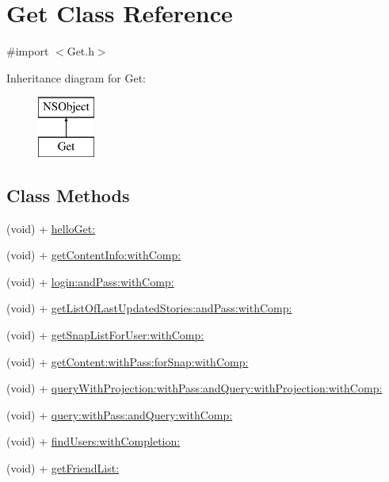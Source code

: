 \hypertarget{interface_get}{}\section{Get Class Reference}
\label{interface_get}


{\ttfamily \#import $<$Get.\+h$>$}

Inheritance diagram for Get\+:\begin{figure}[H]
\begin{center}
\leavevmode
\includegraphics[height=2.000000cm]{interface_get}
\end{center}
\end{figure}
\subsection*{Class Methods}
\begin{DoxyCompactItemize}
\item 
(void) + \hyperlink{interface_get_af1d0a2c1422b398f8f1e5032a78224c8}{hello\+Get\+:}
\item 
(void) + \hyperlink{interface_get_ad2ab0ea6e3e0b8253cfe9998196d1cc5}{get\+Content\+Info\+:with\+Comp\+:}
\item 
(void) + \hyperlink{interface_get_a76426840dad90ee35b87ad57ea87a3ca}{login\+:and\+Pass\+:with\+Comp\+:}
\item 
(void) + \hyperlink{interface_get_a294eb503a9541579ae174d43d506766c}{get\+List\+Of\+Last\+Updated\+Stories\+:and\+Pass\+:with\+Comp\+:}
\item 
(void) + \hyperlink{interface_get_ae8e3a45bcd2a619dac633c369dbcf886}{get\+Snap\+List\+For\+User\+:with\+Comp\+:}
\item 
(void) + \hyperlink{interface_get_aeabf77fd137db06ffa9defbb08a84ce2}{get\+Content\+:with\+Pass\+:for\+Snap\+:with\+Comp\+:}
\item 
(void) + \hyperlink{interface_get_a204cd698f188114cc013c76616964a6a}{query\+With\+Projection\+:with\+Pass\+:and\+Query\+:with\+Projection\+:with\+Comp\+:}
\item 
(void) + \hyperlink{interface_get_adbd4ada23c895311921cbf56982df2b8}{query\+:with\+Pass\+:and\+Query\+:with\+Comp\+:}
\item 
(void) + \hyperlink{interface_get_a8cfe18ecbe3c58ff22d22b734ecd53cf}{find\+Users\+:with\+Completion\+:}
\item 
(void) + \hyperlink{interface_get_a7259a1bb988bb688fb7696beb238f654}{get\+Friend\+List\+:}
\end{DoxyCompactItemize}


